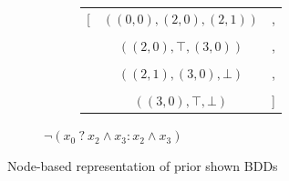 \documentclass[english, aspectratio=169]{beamer}
\begin{document}
\begin{frame}
\begin{figure}
\begin{subfigure}{0.49\linewidth}
      \begin{subfigure}[b]{0.33\linewidth}
        \centering
        \begin{tikzpicture}[scale=0.6, every node/.style={transform shape}]
          
        \end{tikzpicture}
      \end{subfigure}
      \begin{subfigure}[b]{0.55\linewidth}
        \centering
        { \tiny
          \begin{tabular}{r c l}
            [ & $((0,0), (2,0), (2,1))$ & ,
            \\ \\
              & $((2,0), \top, (3,0))$  & ,
            \\ \\
              & $((2,1), (3,0), \bot)$  & ,
            \\ \\
              & $((3,0), \top, \bot)$   & ]
          \end{tabular}
          \vspace{10pt}
        }
      \end{subfigure}

      \caption{$\neg(x_0\ ?\ x_2 \wedge x_3 : x_2 \wedge x_3)$}
    \end{subfigure}

    \caption{Node-based representation of prior shown BDDs}
  \end{figure}

\end{frame}
\end{document}
